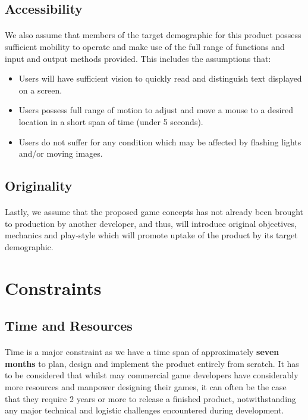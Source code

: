 \documentclass{article}
\begin{document}
\subsection{Accessibility}

\paragraph{}We also assume that members of the target demographic for this product possess sufficient mobility to operate and make use of the full range of functions and input and output methods provided.  This includes the assumptions that: 

\begin{itemize}
    \item Users will have sufficient vision to quickly read and distinguish text displayed on a screen.
    
    \item Users possess full range of motion to adjust and move a mouse to a desired location in a short span of time (under 5 seconds).
    
    \item Users do not suffer for any condition which may be affected by flashing lights and/or moving images.
\end{itemize}

\subsection{Originality}

\paragraph{}Lastly, we assume that the proposed game concepts has not already been brought to production by another developer, and thus, will introduce original objectives, mechanics and play-style which will promote uptake of the product by its target demographic.

\section{Constraints}

\subsection{Time and Resources}

\paragraph{}Time is a major constraint as we have a time span of approximately \textbf{seven months} to plan, design and implement the product entirely from scratch.  It has to be considered that whilst may commercial game developers have considerably more resources and manpower designing their games, it can often be the case that they require 2 years or more to release a finished product, notwithstanding any major technical and logistic challenges encountered during development. 
\end{document}
